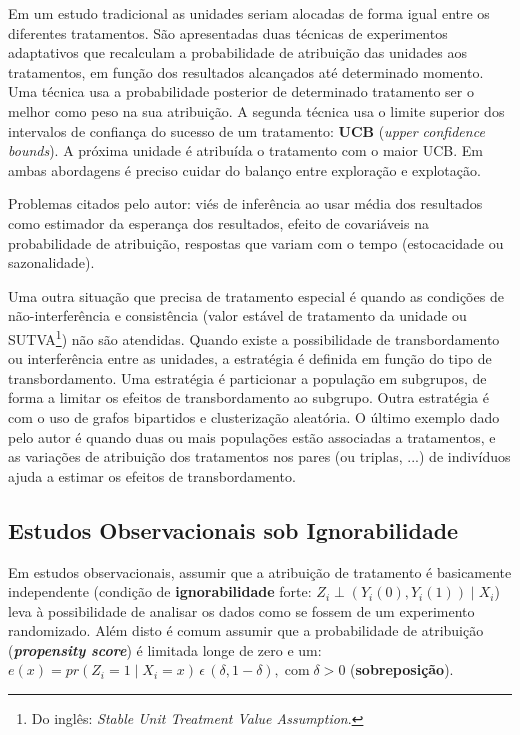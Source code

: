 \documentclass[final,5p]{elsarticle}
\numberwithin{equation}{section}
\begin{document}
    Em um estudo tradicional as unidades seriam alocadas de forma igual entre os diferentes tratamentos. São apresentadas duas técnicas de experimentos adaptativos que recalculam a probabilidade de atribuição das unidades aos tratamentos, em função dos resultados alcançados até determinado momento. Uma técnica usa a probabilidade posterior de determinado tratamento ser o melhor como peso na sua atribuição. A segunda técnica usa o limite superior dos intervalos de confiança do sucesso de um tratamento: \textbf{UCB} (\textit{upper confidence bounds}). A próxima unidade é atribuída o tratamento com o maior UCB. Em ambas abordagens é preciso cuidar do balanço entre exploração e explotação.

    Problemas citados pelo autor: viés de inferência ao usar média dos resultados como estimador da esperança dos resultados, efeito de covariáveis na probabilidade de atribuição, respostas que variam com o tempo (estocacidade ou sazonalidade).

    Uma outra situação que precisa de tratamento especial é quando as condições de não-interferência e consistência (valor estável de tratamento da unidade ou SUTVA\footnote{Do inglês: \textit{Stable Unit Treatment Value Assumption}.}) não são atendidas. Quando existe a possibilidade de transbordamento ou interferência entre as unidades, a estratégia é definida em função do tipo de transbordamento. Uma estratégia é particionar a população em subgrupos, de forma a limitar os efeitos de transbordamento ao subgrupo. Outra estratégia é com o uso de grafos bipartidos e clusterização aleatória. O último exemplo dado pelo autor é quando duas ou mais populações estão associadas a tratamentos, e as variações de atribuição dos tratamentos nos pares (ou triplas, ...) de indivíduos ajuda a estimar os efeitos de transbordamento.

    \subsection{Estudos Observacionais sob Ignorabilidade}

    Em estudos observacionais, assumir que a atribuição de tratamento é basicamente independente (condição de \textbf{ignorabilidade} forte: $Z_i \perp (Y_i(0),Y_i(1)) \mid X_i$) leva à possibilidade de analisar os dados como se fossem de um experimento randomizado. Além disto é comum assumir que a probabilidade de atribuição (\textbf{\textit{propensity score}}) é limitada longe de zero e um: $e(x) = pr(Z_i=1 \mid X_i=x)\, \epsilon \, (\delta, 1 - \delta), \; \text{com} \; \delta > 0$ (\textbf{sobreposição}).
\end{document}
